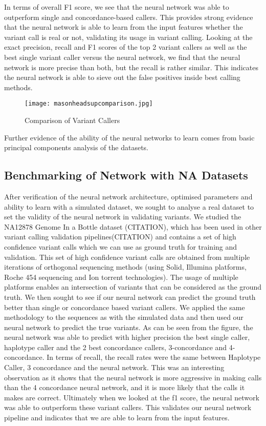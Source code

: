 \documentclass{article}
\begin{document}
In terms of overall F1 score, we see that the neural network was able to outperform single and concordance-based callers. This provides strong evidence that the neural network is able to learn from the input features whether the variant call is real or not, validating its usage in variant calling. Looking at the exact precision, recall and F1 scores of the top 2 variant callers as well as the best single variant caller versus the neural network, we find that the neural network is more precise than both, but the recall is rather similar. This indicates the neural network is able to sieve out the false positives inside best calling methods. 

\begin{figure}[H]
\texttt{[image: masonheadsupcomparison.jpg]}
\caption{Comparison of Variant Callers}
\centering
\end{figure}

Further evidence of the ability of the neural networks to learn comes from basic principal components analysis of the datasets. 

\subsection{Benchmarking of Network with NA Datasets}
After verification of the neural network architecture, optimised parameters and ability to learn with a simulated dataset, we sought to analyse a real dataset to set the validity of the neural network in validating variants. We studied the NA12878 Genome In a Bottle dataset (CITATION), which has been used in other variant calling validation pipelines(CITATION) and contains a set of high confidence variant calls which we can use as ground truth for training and validation. This set of high confidence variant calls are obtained from multiple iterations of orthogonal sequencing methods (using Solid, Illumina platforms, Roche 454 sequencing and Ion torrent technologies). The usage of multiple platforms enables an intersection of variants that can be considered as the ground truth. We then sought to see if our neural network can predict the ground truth better than single or concordance based variant callers. We applied the same methodology to the sequences as with the simulated data and then used our neural network to predict the true variants. As can be seen from the figure, the neural network was able to predict with higher precision the best single caller, haplotype caller and the 2 best concordance callers, 3-concordance and 4-concordance. In terms of recall, the recall rates were the same between Haplotype Caller, 3 concordance and the neural network. This was an interesting observation as it shows that the neural network is more aggressive in making calls than the 4 concordance neural network, and it is more likely that the calls it makes are correct. Ultimately when we looked at the f1 score, the neural network was able to outperform these variant callers. This validates our neural network pipeline and indicates that we are able to learn from the input features. 
\end{document}
